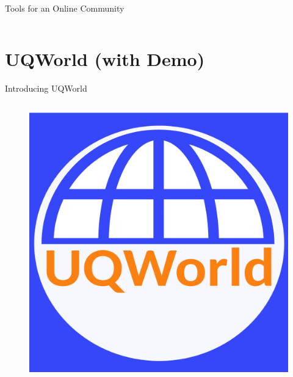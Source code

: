 \documentclass[]{rsuqbeamernew}
\begin{document}
\begin{frame}[t]{Tools for an Online Community}
\begin{columns}
 \end{columns}
\end{frame}
  
\section{UQWorld (with Demo)}

\begin{frame}[t]{Introducing UQWorld}
  
  \begin{columns}
    \begin{minipage}[c][0.85\textheight][c]{\linewidth}
      \begin{figure}
        \centering
        \includegraphics[width=1.0\linewidth]{../figures/uqworld_logo.png}
      \end{figure}
    \end{minipage}
      

\end{columns}
\end{frame}
\end{document}
